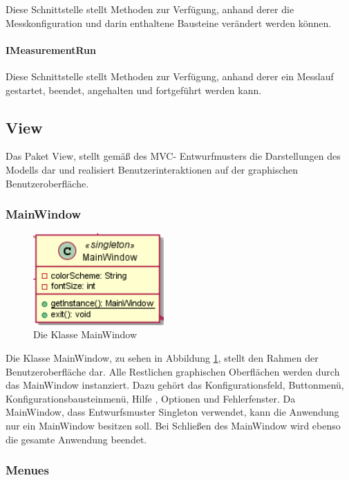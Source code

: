 \documentclass[parskip=full]{scrartcl}
\begin{document}
Diese Schnittstelle stellt Methoden zur Verfügung, anhand derer die Messkonfiguration und darin enthaltene Bausteine verändert werden können.

\paragraph{IMeasurementRun}

Diese Schnittstelle stellt Methoden zur Verfügung, anhand derer ein Messlauf gestartet, beendet, angehalten und fortgeführt werden kann.

\clearpage
\subsection{View}
Das Paket View, stellt gemäß des MVC- Entwurfmusters die Darstellungen des Modells dar und realisiert Benutzerinteraktionen auf der graphischen Benutzeroberfläche. 

\subsubsection{MainWindow} 

\begin{figure}[htbp]
	\begin{center}
		\includegraphics[width = 5cm]{Grafiken/View/MainWindow.PNG}
		\caption{Die Klasse MainWindow}
		\label{MainWindow}
	\end{center}
\end{figure}

Die Klasse MainWindow, zu sehen in Abbildung \ref{MainWindow}, stellt den Rahmen der Benutzeroberfläche dar. Alle Restlichen graphischen Oberflächen werden durch das MainWindow instanziert. Dazu gehört das Konfigurationsfeld, Buttonmenü, Konfigurationsbausteinmenü, Hilfe , Optionen und Fehlerfenster. 
Da MainWindow, dass Entwurfsmuster Singleton verwendet, kann die Anwendung nur ein MainWindow besitzen soll.
Bei Schließen des MainWindow wird ebenso die gesamte Anwendung beendet.

\newpage

\subsubsection{Menues}
\end{document}
